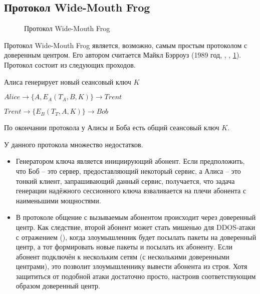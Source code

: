 \subsection{Протокол Wide-Mouth Frog}\label{section-protocols-wide-moth-frog}

\begin{figure}
	\centering
	\begin{sequencediagram}
		
	\end{sequencediagram}
	\caption{Протокол Wide-Mouth Frog\label{fig:key_distribution-wide-mouth_frog}}
\end{figure}

Протокол Wide-Mouth Frog является, возможно, самым простым протоколом с доверенным центром. Его автором считается Майкл Бэрроуз (1989 год, , \cite{Burrows:Abadi:Needham:1990}, \ref{fig:key_distribution-wide-mouth_frog}). Протокол состоит из следующих проходов.

\begin{protocol}
	\item[(1)] Алиса генерирует новый сеансовый ключ $K$
    \item[{}] $Alice \to \{ A, E_A \left( T_A, B, K \right) \} \to Trent$
	\item[(2)] $Trent \to \{ E_B \left( T_T, A, K \right) \} \to Bob$
\end{protocol}

По окончании протокола у Алисы и Боба есть общий сеансовый ключ $K$.

У данного протокола множество недостатков.

\begin{itemize}
	\item Генератором ключа является инициирующий абонент. Если предположить, что Боб -- это сервер, предоставляющий некоторый сервис, а Алиса -- это тонкий клиент, запрашивающий данный сервис, получается, что задача генерации надёжного сессионного ключа взваливается на плечи абонента с наименьшими мощностями.
	\item В протоколе общение с вызываемым абонентом происходит через доверенный центр. Как следствие, второй абонент может стать мишенью для DDOS-атаки с отражением (), когда злоумышленник будет посылать пакеты на доверенный центр, а тот формировать новые пакеты и посылать их абоненту. Если абонент подключён к нескольким сетям (с несколькими доверенными центрами), это позволит злоумышленнику вывести абонента из строя. Хотя защититься от подобной атаки достаточно просто, настроив соответствующим образом доверенный центр.
\end{itemize}

